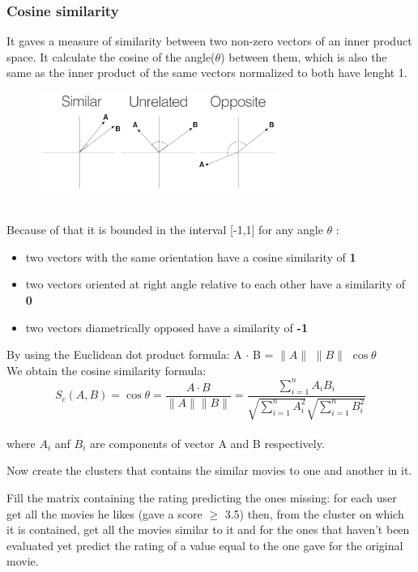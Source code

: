 \documentclass{article}
\begin{document}
\subsubsection{Cosine similarity}
It gaves a measure of similarity between two non-zero vectors of an inner product space. It calculate the cosine of the angle($\theta$) between them, which is also the same as the inner product of the same vectors normalized to both have lenght 1. \\
\begin{figure}[ht]
      \begin{center}
            \includegraphics[width=0.7\textwidth]{images/cosine.png}
      \end{center}
\end{figure}\\
Because of that it is bounded in the interval [-1,1] for any angle $\theta$ :
\begin{itemize}
      \item two vectors with the same orientation have a cosine similarity of \textbf{1}
      \item two vectors oriented at right angle relative to each other have a similarity of \textbf{0}
      \item two vectors diametrically opposed have a similarity of \textbf{-1}
\end{itemize}
By using the Euclidean dot product formula:
A $\cdot$ B = $\|A\|$ $\|B\|$ $\cos\theta$ \\
We obtain the cosine similarity formula:\\
\begin{equation}
      S_c(A,B) = \cos\theta = \frac{A \cdot B}{\|A\| \|B\|} = \frac{\sum_{i=1}^n A_i B_i}{\sqrt{\sum_{i=1}^n A_i^2}\sqrt{\sum_{i=1}^n B_i^2}}
\end{equation}\\
where $A_i$ anf $B_i$ are components of vector A and B respectively.


Now create the clusters that contains the similar movies to one and another in it. 

Fill the matrix containing the rating predicting the ones missing:
for each user get all the movies he likes (gave a score $\ge$ 3.5) 
then, from the cluster on which it is contained, get all the movies similar to it and for the ones that haven't been evaluated yet predict the rating of a value equal to the one gave for the original movie.
\end{document}

